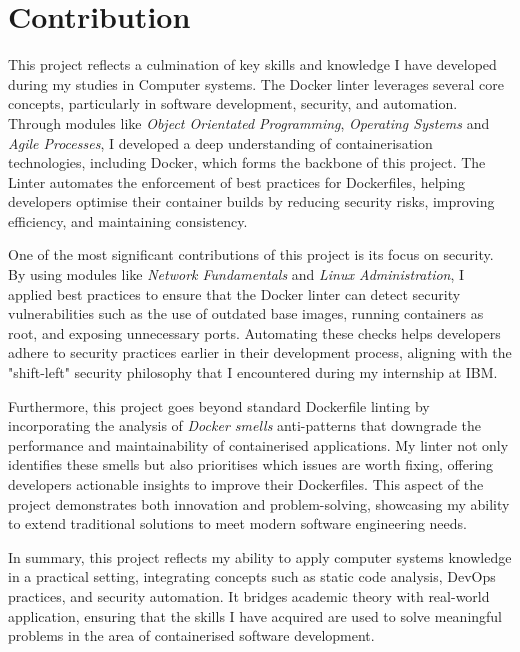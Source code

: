 \section{Contribution}
This project reflects a culmination of key skills and knowledge I have developed during my studies in Computer systems. The Docker linter leverages several core concepts, particularly in software development, security, and automation. Through modules like \textit{Object Orientated Programming}, \textit{Operating Systems} and \textit{Agile Processes}, I developed a deep understanding of containerisation technologies, including Docker, which forms the backbone of this project. The Linter automates the enforcement of best practices for Dockerfiles, helping developers optimise their container builds by reducing security risks, improving efficiency, and maintaining consistency.

One of the most significant contributions of this project is its focus on security. By using  modules like \textit{Network Fundamentals} and \textit{Linux Administration}, I applied best practices to ensure that the Docker linter can detect security vulnerabilities such as the use of outdated base images, running containers as root, and exposing unnecessary ports. Automating these checks helps developers adhere to  security practices earlier in their development process, aligning with the "shift-left" security philosophy that I encountered during my internship at IBM.

Furthermore, this project goes beyond standard Dockerfile linting by incorporating the analysis of \textit{Docker smells} anti-patterns that downgrade the performance and maintainability of containerised applications. My linter not only identifies these smells but also prioritises which issues are worth fixing, offering developers actionable insights to improve their Dockerfiles. This aspect of the project demonstrates both innovation and problem-solving, showcasing my ability to extend traditional solutions to meet modern software engineering needs.

In summary, this project reflects my ability to apply computer systems knowledge in a practical setting, integrating concepts such as static code analysis, DevOps practices, and security automation. It bridges academic theory with real-world application, ensuring that the skills I have acquired are used to solve meaningful problems in the area of containerised software development.

